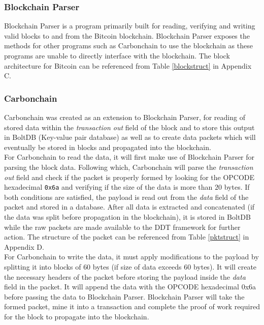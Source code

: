 \documentclass[a4paper,12pt]{article}
\begin{document}
{		\subsubsection{Blockchain Parser}
	Blockchain Parser is a program primarily built for reading, verifying and writing valid blocks to and from the Bitcoin blockchain. Blockchain Parser exposes the methods for other programs such as Carbonchain to use the blockchain as these programs are unable to directly interface with the blockchain. The block architecture for Bitcoin can be referenced from Table \ref{blockstruct} in Appendix C.
	\subsubsection{Carbonchain}
	{\par Carbonchain was created as an extension to Blockchain Parser, for reading of stored data within the \textit{transaction out} field of the block and to store this output in BoltDB (Key-value pair database) as well as to create data packets which will eventually be stored in blocks and propagated into the blockchain.\\\newline
	For Carbonchain to read the data, it will first make use of Blockchain Parser for parsing the block data. Following which, Carbonchain will parse the \textit{transaction out} field and check if the packet is properly formed by looking for the \ac{OPCODE} hexadecimal \texttt{0x6a} and verifying if the size of the data is more than $20$ bytes. If both conditions are satisfied, the payload is read out from the \textit{data} field of the packet and stored in a database. After all data is extracted and concatenated (if the data was split before propagation in the blockchain), it is stored in BoltDB while the raw packets are made available to the \ac{DDT} framework for further action. The structure of the packet can be referenced from Table \ref{pktstruct} in Appendix D.\\\newline
	For Carbonchain to write the data, it must apply modifications to the payload by splitting it into blocks of $60$ bytes (if size of data exceeds $60$ bytes). It will create the necessary headers of the packet before storing the payload inside the \textit{data} field in the packet. It will append the data with the \ac{OPCODE} hexadecimal 0x6a before passing the data to Blockchain Parser. Blockchain Parser will take the formed packet, mine it into a transaction and complete the proof of work required for the block to propagate into the blockchain.
}
}
\end{document}
